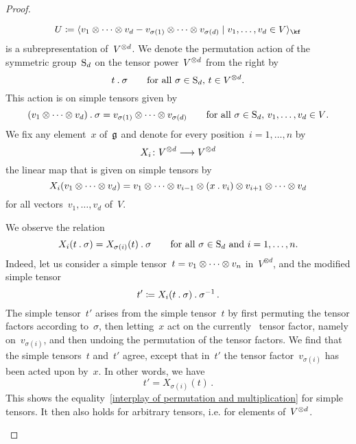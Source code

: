 \begin{proof}
\begin{enumerate}
      \[
        U
        \defined
        \gen{
          v_1 \tensor \dotsb \tensor v_d
          - v_{\sigma(1)} \tensor \dotsb \tensor v_{\sigma(d)}
        \suchthat
          v_1, \dotsc, v_d \in V
        }_{\kf}
      \]
      is a subrepresentation of~$V^{\otimes d}$.
      We denote the permutation action of the symmetric group~$\operatorname{S}_d$ on the tensor power~$V^{\otimes d}$ from the right by
      \[
        t \mathbin{.} \sigma
        \qquad
        \text{for all~$\sigma \in \operatorname{S}_d$,~$t \in V^{\otimes d}$.}
      \]
      This action is on simple tensors given by
      \[
        (v_1 \otimes \dotsb \otimes v_d) \mathbin{.} \sigma
        =
        v_{\sigma(1)} \otimes \dotsb \otimes v_{\sigma(d)}
        \qquad
        \text{for all~$\sigma \in \operatorname{S}_d$,~$v_1, \dotsc, v_d \in V$.}
      \]
      We fix any element~$x$ of~$\mathfrak{g}$ and denote for every position~$i = 1, \dotsc, n$ by
      \[
        X_i
        \colon
        V^{\tensor d}
        \to
        V^{\tensor d}
      \]
      the linear map that is given on simple tensors by
      \[
        X_i(v_1 \otimes \dotsb \otimes v_d)
        =
        v_1 \otimes \dotsb \otimes v_{i-1}
        \otimes (x \mathbin{.} v_i)
        \otimes v_{i+1} \otimes \dotsb \otimes v_d
      \]
      for all vectors~$v_1, \dotsc, v_d$ of~$V$.
      
      We observe the relation
      \begin{equation}
        \label{interplay of permutation and multiplication}
        X_i( t \mathbin{.} \sigma )
        =
        X_{\sigma(i)}(t) \mathbin{.} \sigma
        \qquad
        \text{for all~$\sigma \in \operatorname{S}_d$ and~$i = 1, \dotsc, n$}.
      \end{equation}
      Indeed, let us consider a simple tensor~$t = v_1 \otimes \dotsb \otimes v_n$ in~$V^{\otimes d}$, and the modified simple tensor
      \[
        t'
        \coloneqq
        X_i( t \mathbin{.} \sigma) \mathbin{.} \sigma^{-1} \,.
      \]
      The simple tensor~$t'$ arises from the simple tensor~$t$ by first permuting the tensor factors according to~$\sigma$, then letting~$x$ act on the currently~ tensor factor, namely on~$v_{\sigma(i)}$, and then undoing the permutation of the tensor factors.
      We find that the simple tensors~$t$ and~$t'$ agree, except that in~$t'$ the tensor factor~$v_{\sigma(i)}$ has been acted upon by~$x$.
      In other words, we have
      \[
        t' = X_{\sigma(i)}(t) \,.
      \]
      This shows the equality~\eqref{interplay of permutation and multiplication} for simple tensors.
      It then also holds for arbitrary tensors, i.e. for elements of~$V^{\otimes d}$.
      

\end{enumerate}
\end{proof}
